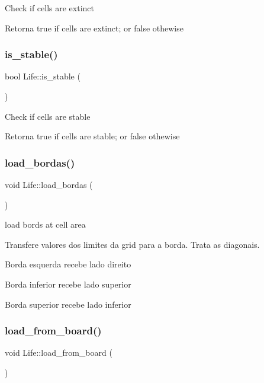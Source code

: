 Check if cells are extinct \begin{DoxyReturn}{Retorna}
true if cells are extinct; or false othewise 
\end{DoxyReturn}
\mbox{\label{classLife_a773454947fcc1f7c576c8749647d9ba2}} 
\subsubsection{\texorpdfstring{is\+\_\+stable()}{is\_stable()}}
{\footnotesize\ttfamily bool Life\+::is\+\_\+stable (\begin{DoxyParamCaption}{ }\end{DoxyParamCaption})}

Check if cells are stable \begin{DoxyReturn}{Retorna}
true if cells are stable; or false othewise 
\end{DoxyReturn}
\mbox{\label{classLife_a8cc497d4d07aa0d9b6b31faa14f0e12f}} 
\subsubsection{\texorpdfstring{load\+\_\+bordas()}{load\_bordas()}}
{\footnotesize\ttfamily void Life\+::load\+\_\+bordas (\begin{DoxyParamCaption}{ }\end{DoxyParamCaption})}



load bords at cell area 

Transfere valores dos limites da grid para a borda. Trata as diagonais.

Borda esquerda recebe lado direito

Borda inferior recebe lado superior

Borda superior recebe lado inferior \mbox{\label{classLife_a17e8f25c5f814ee868ef3f943c9dddcd}} 
\subsubsection{\texorpdfstring{load\+\_\+from\+\_\+board()}{load\_from\_board()}}
{\footnotesize\ttfamily void Life\+::load\+\_\+from\+\_\+board (\begin{DoxyParamCaption}{ }\end{DoxyParamCaption})}



